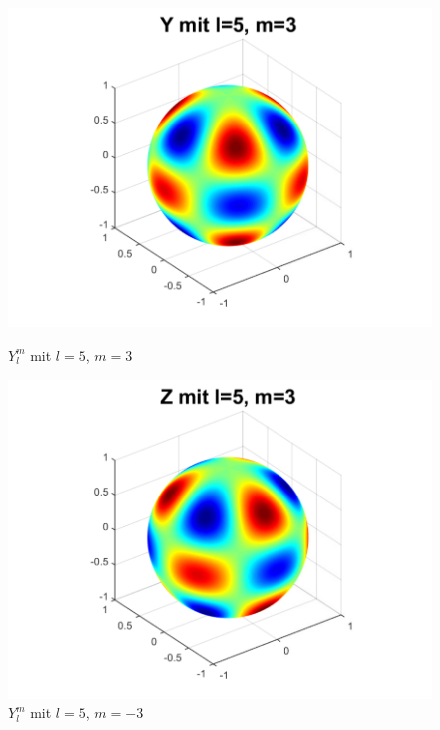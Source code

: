 \begin{figure}
\begin{minipage}[hbt]{0.4\textwidth}
\centering
\includegraphics[width=1\textwidth]{chapters/images/ylm/a_5_3.pdf}
\caption{$Y^m_l$ mit $l=5$, $m=3$}
\label{skript:ylm l=5 m=3}
\end{minipage}
\hfill
\begin{minipage}[hbt]{0.4\textwidth}
\centering
\includegraphics[width=1\textwidth]{chapters/images/ylm/b_5_3.pdf}
\caption{$Y^m_l$ mit $l=5$, $m=-3$}
\label{skript:zlm l=5 m=3}
\end{minipage}
\begin{minipage}[hbt]{0.4\textwidth}
\centering

\end{minipage}
\end{figure}
